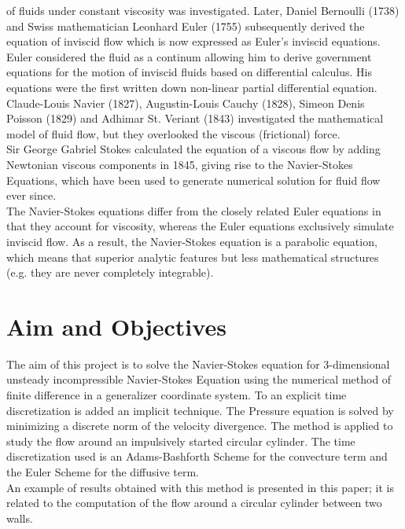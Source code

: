 \documentclass[11pt]{report}
\begin{document}
	of fluids under constant viscosity was investigated. Later, Daniel Bernoulli (1738) and Swiss mathematician Leonhard Euler (1755) subsequently derived the equation of inviscid flow which is now expressed as Euler's inviscid equations. Euler considered the fluid as a continum allowing him to derive government equations for the motion of inviscid fluids based on differential calculus. His equations were the first written down non-linear partial differential equation.\\
	
	Claude-Louis Navier (1827), Augustin-Louis Cauchy (1828), Simeon Denis Poisson (1829) and Adhimar St. Veriant (1843) investigated the mathematical model of fluid flow, but they overlooked the viscous (frictional) force.\\
	
	Sir George Gabriel Stokes calculated the equation of a viscous flow by adding Newtonian viscous components in 1845, giving rise to the Navier-Stokes Equations, which have been used to generate numerical solution for fluid flow ever since.\\
	
	The Navier-Stokes equations differ from the closely related Euler equations in that they account for viscosity, whereas the Euler equations exclusively simulate inviscid flow. As a result, the Navier-Stokes equation is a parabolic equation, which means that superior analytic features but less mathematical structures (e.g. they are never completely integrable).

	\section{Aim and Objectives}
	The aim of this project is to solve the Navier-Stokes equation for 3-dimensional unsteady incompressible Navier-Stokes Equation using the numerical method of finite difference in a generalizer coordinate system. To an explicit time discretization is added an implicit technique. The Pressure equation is solved by minimizing a discrete norm of the velocity divergence. The method is applied to study the flow around an impulsively started circular cylinder. The time discretization used is an Adams-Bashforth Scheme for the convecture term and the Euler Scheme for the diffusive term.\\
	
	An example of results obtained with this method is presented in this paper; it is related to the computation of the flow around a circular cylinder between two walls.
\end{document}
